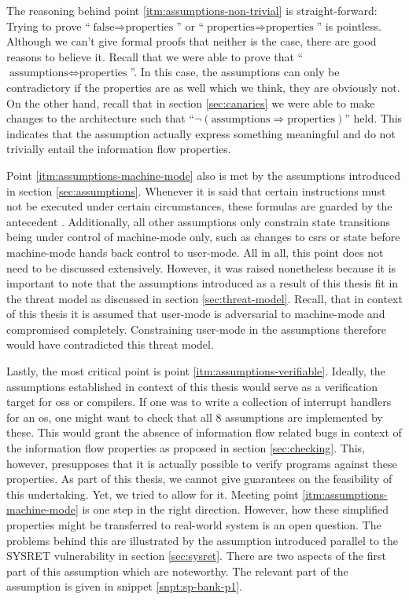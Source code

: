 The reasoning behind point \ref{itm:assumptions-non-trivial} is straight-forward:
Trying to prove \enquote{$ \text{false} \Rightarrow \text{properties} $} or \enquote{$ \text{properties} \Rightarrow \text{properties} $} is pointless.
Although we can't give formal proofs that neither is the case, there are good reasons to believe it.
Recall that we were able to prove that \enquote{$ \text{assumptions} \Leftrightarrow \text{properties} $}.
In this case, the assumptions can only be contradictory if the properties are as well which we think, they are obviously not.
On the other hand, recall that in section \ref{sec:canaries} we were able to make changes to the architecture such that \enquote{$ \neg(\text{assumptions} \Rightarrow \text{properties}) $} held.
This indicates that the assumption actually express something meaningful and do not trivially entail the information flow properties.

Point \ref{itm:assumptions-machine-mode} also is met by the assumptions introduced in section \ref{sec:assumptions}.
Whenever it is said that certain instructions must not be executed under certain circumstances, these formulas are guarded by the antecedent .
Additionally, all other assumptions only constrain state transitions being under control of machine-mode only, such as changes to \glspl{csr} or state before machine-mode hands back control to user-mode.
All in all, this point does not need to be discussed extensively.
However, it was raised nonetheless because it is important to note that the assumptions introduced as a result of this thesis fit in the threat model as discussed in section \ref{sec:threat-model}.
Recall, that in context of this thesis it is assumed that user-mode is adversarial to machine-mode and compromised completely.
Constraining user-mode in the assumptions therefore would have contradicted this threat model.

Lastly, the most critical point is point \ref{itm:assumptions-verifiable}.
Ideally, the assumptions established in context of this thesis would serve as a verification target for \glspl{os} or compilers.
If one was to write a collection of interrupt handlers for an \gls{os}, one might want to check that all 8 assumptions are implemented by these.
This would grant the absence of information flow related bugs in context of the information flow properties as proposed in section \ref{sec:checking}.
This, however, presupposes that it is actually possible to verify programs against these properties.
As part of this thesis, we cannot give guarantees on the feasibility of this undertaking.
Yet, we tried to allow for it.
Meeting point \ref{itm:assumptions-machine-mode} is one step in the right direction.
However, how these simplified properties might be transferred to real-world system is an open question.
The problems behind this are illustrated by the  assumption introduced parallel to the SYSRET vulnerability in section \ref{sec:sysret}.
There are two aspects of the first part of this assumption which are noteworthy.
The relevant part of the  assumption is given in snippet \ref{snpt:sp-bank-p1}.

